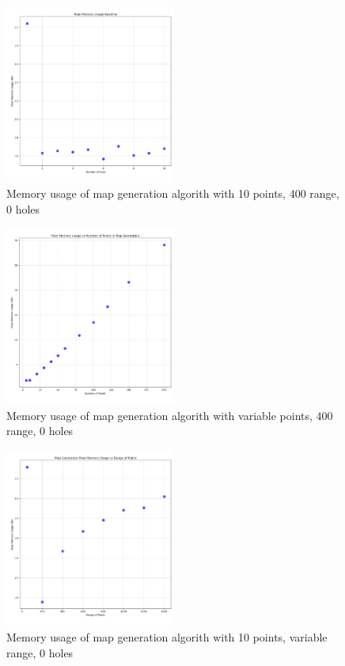\documentclass[final]{cmpreport_02}
\begin{document}
\begin{figure}[h!]
	\centering
	\includegraphics[width=0.5\textwidth]{./images/mapGenBaselineMem.png}
	\caption{Memory usage of map generation algorith with 10 points, 400 range, 0 holes}
	\label{PE:mg:memBaseline}
\end{figure}

\begin{figure}[h!]
	\centering
	\includegraphics[width=0.5\textwidth]{./images/mapGenPointsMem.png}
	\caption{Memory usage of map generation algorith with variable points, 400 range, 0 holes}
    \label{PE:mg:memPoints}
\end{figure}

\begin{figure}[h!]
	\centering
	\includegraphics[width=0.5\textwidth]{./images/mapGenRangeMem.png}
	\caption{Memory usage of map generation algorith with 10 points, variable range, 0 holes}
	\label{PE:mg:memRange}
\end{figure}
\end{document}
